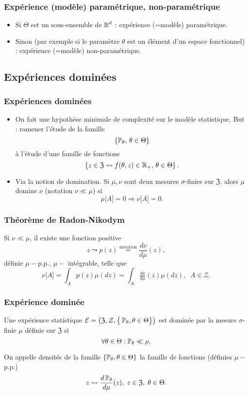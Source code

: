 \begin{frame}
\frametitle{Expérience (mod\`ele) paramétrique, non-paramétrique}
\begin{itemize}
\item Si $\Theta$ est  un sous-ensemble
de $\operatorname{{\mathbb R}}^d$ : \alert{expérience (=mod\`ele) paramétrique}.
\item Sinon (par exemple si le paramètre $\theta$ est un élément d'un espace fonctionnel) : \alert{expérience (=mod\`ele) non-paramétrique}.
\end{itemize}
\end{frame}

\subsection{Expériences dominées}
\begin{frame}
\frametitle{Expériences dominées}
\begin{itemize}
\item On fait une hypothèse minimale de \og complexité \fg{} sur le modèle statistique. \alert{But} : ramener l'étude de la famille
$$\{\operatorname{{\mathbb P}}_\theta,\,\theta \in \Theta\}$$
à l'étude d'une famille de fonctions
$$\left\{z \in \mathfrak{Z} \leadsto f(\theta,z) \in \operatorname{{\mathbb R}}_+,\,\theta \in \Theta\right\}.$$
\item Via la notion de \alert{domination}. Si $\mu,\nu$ sont deux mesures $\sigma$-finies sur $\mathfrak{Z}$, alors $\mu$ \alert{domine} $\nu$ (notation $\nu \ll \mu$) si
$$\mu\big[A\big]=0 \Rightarrow \nu\big[A\big]=0.$$
\end{itemize}
\end{frame}
\begin{frame}
\frametitle{Théorème de Radon-Nikodym}
\begin{theo}
Si $\nu \ll \mu$, il existe une fonction positive
$$z \leadsto  p(z) \stackrel{\text{notation}}{=} \frac{d\nu}{d\mu}(z),$$ définie $\mu-$p.p., $\mu-$ intégrable, telle que
$$\nu\big[A\big] = \int_{A}p(z) \mu(dz) = \int_{A}\tfrac{d\nu}{d\mu}(z)\mu(dz),\;\;A \in {\mathcal Z}.$$
\end{theo}
\end{frame}
\begin{frame}
\frametitle{Expérience dominée}
\begin{df}
Une expérience statistique ${\mathcal E} = \big(\mathfrak{Z}, {\mathcal Z}, \big\{\operatorname{{\mathbb P}}_\theta, \theta \in \Theta\big\}\big)$ est \alert{dominée} par la mesure $\sigma$-finie $\mu$ définie sur $\mathfrak{Z}$ si
$$\forall \theta \in \Theta : \operatorname{{\mathbb P}}_\theta \ll \mu.$$
\end{df}
On appelle \alert{densités} de la famille $\{\operatorname{{\mathbb P}}_\theta,\theta \in \Theta\}$ la famille de fonctions (définies $\mu-$ p.p.)
$$z\leadsto \frac{d\operatorname{{\mathbb P}}_\theta}{d\mu}(z),\;z\in \mathfrak{Z},\;\theta \in \Theta.$$
\end{frame}




